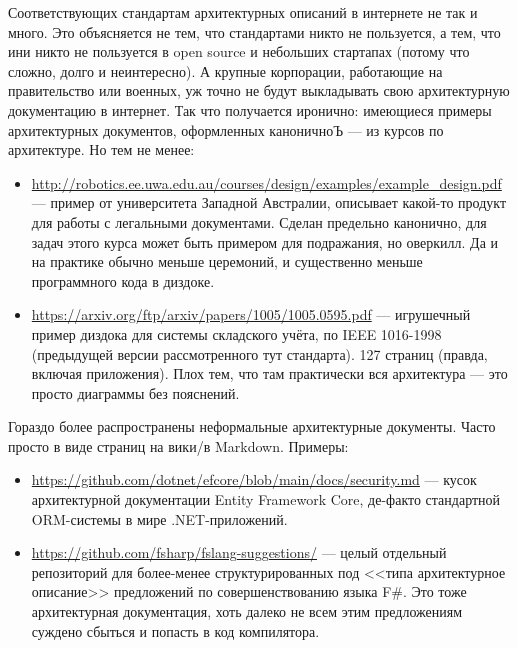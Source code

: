 \documentclass[a5paper]{article}
\begin{document}
Соответствующих стандартам архитектурных описаний в интернете не так и много. Это объясняется не тем, что стандартами никто не пользуется, а тем, что ини никто не пользуется в open source и небольших стартапах (потому что сложно, долго и неинтересно). А крупные корпорации, работающие на правительство или военных, уж точно не будут выкладывать свою архитектурную документацию в интернет. Так что получается иронично: имеющиеся примеры архитектурных документов, оформленных каноничноЪ --- из курсов по архитектуре. Но тем не менее:

\begin{itemize}
    \item \url{http://robotics.ee.uwa.edu.au/courses/design/examples/example_design.pdf} --- пример от университета Западной Австралии, описывает какой-то продукт для работы с легальными документами. Сделан предельно канонично, для задач этого курса может быть примером для подражания, но оверкилл. Да и на практике обычно меньше церемоний, и существенно меньше программного кода в диздоке.
    \item \url{https://arxiv.org/ftp/arxiv/papers/1005/1005.0595.pdf} --- игрушечный пример диздока для системы складского учёта, по IEEE 1016-1998 (предыдущей версии рассмотренного тут стандарта). 127 страниц (правда, включая приложения). Плох тем, что там практически вся архитектура --- это просто диаграммы без пояснений.
\end{itemize}

Гораздо более распространены неформальные архитектурные документы. Часто просто в виде страниц на вики/в Markdown. Примеры:

\begin{itemize}
    \item \url{https://github.com/dotnet/efcore/blob/main/docs/security.md} --- кусок архитектурной документации Entity Framework Core, де-факто стандартной ORM-системы в мире .NET-приложений.
    \item \url{https://github.com/fsharp/fslang-suggestions/} --- целый отдельный репозиторий для более-менее структурированных под <<типа архитектурное описание>> предложений по совершенствованию языка F\#. Это тоже архитектурная документация, хоть далеко не всем этим предложениям суждено сбыться и попасть в код компилятора.
\end{itemize}

\end{document}
